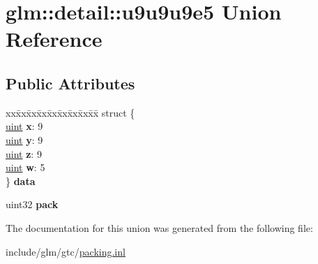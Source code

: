 \hypertarget{unionglm_1_1detail_1_1u9u9u9e5}{}\section{glm\+:\+:detail\+:\+:u9u9u9e5 Union Reference}
\label{unionglm_1_1detail_1_1u9u9u9e5}
\subsection*{Public Attributes}
\begin{DoxyCompactItemize}
\item 
\mbox{\label{unionglm_1_1detail_1_1u9u9u9e5_ab27d3c628cb4c4f6c635de506bb1dc60}} 
\begin{tabbing}
xx\=xx\=xx\=xx\=xx\=xx\=xx\=xx\=xx\=\kill
struct \{\\
\>\hyperlink{group__core__precision_ga4fd29415871152bfb5abd588334147c8}{uint} {\bfseries x}: 9\\
\>\hyperlink{group__core__precision_ga4fd29415871152bfb5abd588334147c8}{uint} {\bfseries y}: 9\\
\>\hyperlink{group__core__precision_ga4fd29415871152bfb5abd588334147c8}{uint} {\bfseries z}: 9\\
\>\hyperlink{group__core__precision_ga4fd29415871152bfb5abd588334147c8}{uint} {\bfseries w}: 5\\
\} {\bfseries data}\\

\end{tabbing}\item 
\mbox{\label{unionglm_1_1detail_1_1u9u9u9e5_a76c0b28299b57da27b9e023091ae9c32}} 
uint32 {\bfseries pack}
\end{DoxyCompactItemize}


The documentation for this union was generated from the following file\+:\begin{DoxyCompactItemize}
\item 
include/glm/gtc/\hyperlink{packing_8inl}{packing.\+inl}\end{DoxyCompactItemize}
